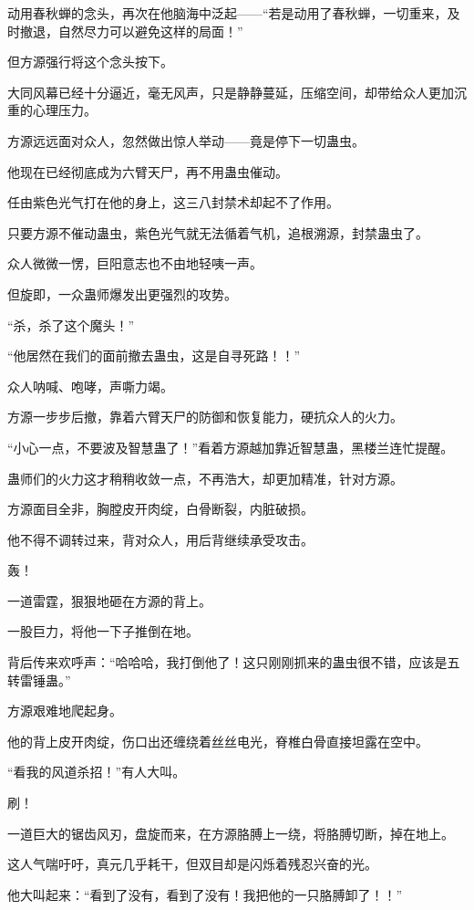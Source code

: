 \begin{this_body}
动用春秋蝉的念头，再次在他脑海中泛起——“若是动用了春秋蝉，一切重来，及时撤退，自然尽力可以避免这样的局面！”

但方源强行将这个念头按下。

大同风幕已经十分逼近，毫无风声，只是静静蔓延，压缩空间，却带给众人更加沉重的心理压力。

方源远远面对众人，忽然做出惊人举动——竟是停下一切蛊虫。

他现在已经彻底成为六臂天尸，再不用蛊虫催动。

任由紫色光气打在他的身上，这三八封禁术却起不了作用。

只要方源不催动蛊虫，紫色光气就无法循着气机，追根溯源，封禁蛊虫了。

众人微微一愣，巨阳意志也不由地轻咦一声。

但旋即，一众蛊师爆发出更强烈的攻势。

“杀，杀了这个魔头！”

“他居然在我们的面前撤去蛊虫，这是自寻死路！！”

众人呐喊、咆哮，声嘶力竭。

方源一步步后撤，靠着六臂天尸的防御和恢复能力，硬抗众人的火力。

“小心一点，不要波及智慧蛊了！”看着方源越加靠近智慧蛊，黑楼兰连忙提醒。

蛊师们的火力这才稍稍收敛一点，不再浩大，却更加精准，针对方源。

方源面目全非，胸膛皮开肉绽，白骨断裂，内脏破损。

他不得不调转过来，背对众人，用后背继续承受攻击。

轰！

一道雷霆，狠狠地砸在方源的背上。

一股巨力，将他一下子推倒在地。

背后传来欢呼声：“哈哈哈，我打倒他了！这只刚刚抓来的蛊虫很不错，应该是五转雷锤蛊。”

方源艰难地爬起身。

他的背上皮开肉绽，伤口出还缠绕着丝丝电光，脊椎白骨直接坦露在空中。

“看我的风道杀招！”有人大叫。

刷！

一道巨大的锯齿风刃，盘旋而来，在方源胳膊上一绕，将胳膊切断，掉在地上。

这人气喘吁吁，真元几乎耗干，但双目却是闪烁着残忍兴奋的光。

他大叫起来：“看到了没有，看到了没有！我把他的一只胳膊卸了！！”


\end{this_body}
